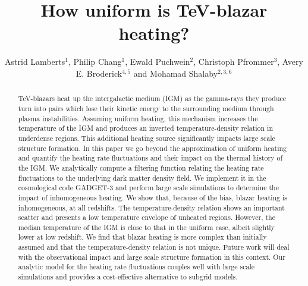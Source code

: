 \documentclass[twocolumns]{emulateapj}
\begin{document}
\title{How uniform is TeV-blazar heating?}

\author{Astrid Lamberts$^1$, Philip Chang$^1$, Ewald Puchwein$^2$, Christoph Pfrommer$^3$, Avery E. Broderick$^{4,5}$ and Mohamad Shalaby$^{2,3,6}$}

\begin{abstract}
TeV-blazars heat up the intergalactic medium (IGM) as the gamma-rays they produce turn into pairs which lose their kinetic energy to the surrounding medium through plasma instabilities.  Assuming uniform heating, this mechanism increases the temperature of the IGM and produces an inverted temperature-density relation in underdense regions. This additional heating source significantly impacts large scale structure formation. In this paper we go beyond the approximation of uniform heating and quantify the heating rate fluctuations and their impact on the thermal history of the IGM. We analytically compute a filtering function relating the heating rate fluctuations to the underlying  dark matter density field. We implement it in the cosmological code GADGET-3 and perform large scale simulations to determine the impact of inhomogeneous heating. We show that, because of the bias, blazar heating is inhomogeneous, at all redshifts. The temperature-density relation shows an important scatter and presents a low temperature envelope of unheated regions. However, the median temperature of the IGM is close to that in the uniform case, albeit slightly lower at low redshift. We find that blazar heating is more complex than initially assumed and that the temperature-density relation is not unique. Future work will deal with the observational impact and large scale structure formation in this context.  Our analytic model for the heating rate fluctuations couples well with large scale simulations and provides a cost-effective alternative to subgrid models.
\end{abstract}
\end{document}
